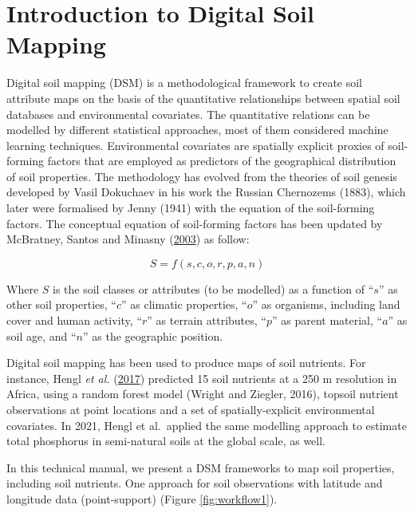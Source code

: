 \documentclass[
  10pt,
  b5paper,
  oneside]{book}
\begin{document}
\hypertarget{introduction-to-digital-soil-mapping}{%
\chapter{Introduction to Digital Soil Mapping}\label{introduction-to-digital-soil-mapping}}

Digital soil mapping (DSM) is a methodological framework to create soil attribute maps on the basis of the quantitative relationships between spatial soil databases and environmental covariates. The quantitative relations can be modelled by different statistical approaches, most of them considered machine learning techniques. Environmental covariates are spatially explicit proxies of soil-forming factors that are employed as predictors of the geographical distribution of soil properties. The methodology has evolved from the theories of soil genesis developed by Vasil Dokuchaev in his work the Russian Chernozems (1883), which later were formalised by Jenny (1941) with the equation of the soil-forming factors. The conceptual equation of soil-forming factors has been updated by McBratney, Santos and Minasny (\protect\hyperlink{ref-McBratney2003}{2003}) as follow:

\begin{equation} 
  S = f\left(s,c,o,r,p,a,n\right)
  \label{eq:scorpan}
\end{equation}

Where \(S\) is the soil classes or attributes (to be modelled) as a function of ``\(s\)'' as other soil properties, ``\(c\)'' as climatic properties, ``\(o\)'' as organisms, including land cover and human activity, ``\(r\)'' as terrain attributes, ``\(p\)'' as parent material, ``\(a\)'' as soil age, and ``\(n\)'' as the geographic position.

Digital soil mapping has been used to produce maps of soil nutrients. For instance, Hengl \emph{et al.} (\protect\hyperlink{ref-Hengl2017}{2017}) predicted 15 soil nutrients at a 250 m resolution in Africa, using a random forest model (Wright and Ziegler, 2016), topsoil nutrient observations at point locations and a set of spatially-explicit environmental covariates. In 2021, Hengl et al.~applied the same modelling approach to estimate total phosphorus in semi-natural soils at the global scale, as well.

In this technical manual, we present a DSM frameworks to map soil properties, including soil nutrients. One approach for soil observations with latitude and longitude data (point-support) (Figure \ref{fig:workflow1}).
\end{document}

